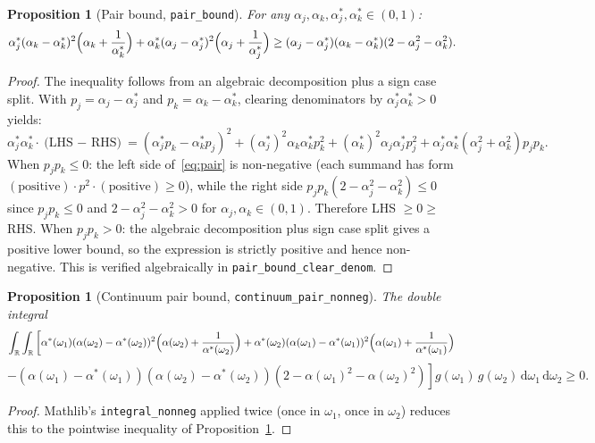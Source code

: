 \documentclass[11pt,a4paper]{article}
\newtheorem{proposition}[theorem]{Proposition}
\theoremstyle{definition}
\newcommand{\R}{\mathbb{R}}
\begin{document}
\begin{proposition}[Pair bound, \texttt{pair\_bound}]\label{prop:pair}
For any $\alpha_j, \alpha_k, \alpha^*_j, \alpha^*_k \in (0,1)$:
\begin{equation}\label{eq:pair}
\alpha^*_j(\alpha_k - \alpha^*_k)^2\Bigl(\alpha_k + \frac{1}{\alpha^*_k}\Bigr) + \alpha^*_k(\alpha_j - \alpha^*_j)^2\Bigl(\alpha_j + \frac{1}{\alpha^*_j}\Bigr) \geq (\alpha_j - \alpha^*_j)(\alpha_k - \alpha^*_k)(2 - \alpha_j^2 - \alpha_k^2).
\end{equation}
\end{proposition}

\begin{proof}
The inequality follows from an algebraic decomposition plus a sign case split. With $p_j = \alpha_j - \alpha^*_j$ and $p_k = \alpha_k - \alpha^*_k$, clearing denominators by $\alpha^*_j \alpha^*_k > 0$ yields:
\[
\alpha^*_j \alpha^*_k \cdot \text{(LHS $-$ RHS)} = (\alpha^*_j p_k - \alpha^*_k p_j)^2 + (\alpha^*_j)^2 \alpha_k \alpha^*_k p_k^2 + (\alpha^*_k)^2 \alpha_j \alpha^*_j p_j^2 + \alpha^*_j \alpha^*_k (\alpha_j^2 + \alpha_k^2) p_j p_k.
\]
When $p_j p_k \leq 0$: the left side of~\eqref{eq:pair} is non-negative (each summand has form $(\text{positive}) \cdot p^2 \cdot (\text{positive}) \geq 0$), while the right side $p_j p_k(2 - \alpha_j^2 - \alpha_k^2) \leq 0$ since $p_j p_k \leq 0$ and $2 - \alpha_j^2 - \alpha_k^2 > 0$ for $\alpha_j, \alpha_k \in (0,1)$. Therefore LHS $\geq 0 \geq$ RHS. When $p_j p_k > 0$: the algebraic decomposition plus sign case split gives a positive lower bound, so the expression is strictly positive and hence non-negative. This is verified algebraically in \texttt{pair\_bound\_clear\_denom}.
\end{proof}

\begin{proposition}[Continuum pair bound, \texttt{continuum\_pair\_nonneg}]\label{prop:cpair}
The double integral
\[
\int_\R \int_\R \left[\alpha^*(\omega_1)(\alpha(\omega_2) - \alpha^*(\omega_2))^2\Bigl(\alpha(\omega_2) + \frac{1}{\alpha^*(\omega_2)}\Bigr) + \alpha^*(\omega_2)(\alpha(\omega_1) - \alpha^*(\omega_1))^2\Bigl(\alpha(\omega_1) + \frac{1}{\alpha^*(\omega_1)}\Bigr)\right.
\]
\[
\left. - (\alpha(\omega_1) - \alpha^*(\omega_1))(\alpha(\omega_2) - \alpha^*(\omega_2))(2 - \alpha(\omega_1)^2 - \alpha(\omega_2)^2)\right] g(\omega_1)\,g(\omega_2)\,\mathrm{d}\omega_1\,\mathrm{d}\omega_2 \geq 0.
\]
\end{proposition}

\begin{proof}
Mathlib's \texttt{integral\_nonneg} applied twice (once in $\omega_1$, once in $\omega_2$) reduces this to the pointwise inequality of Proposition~\ref{prop:pair}.
\end{proof}
\end{document}
